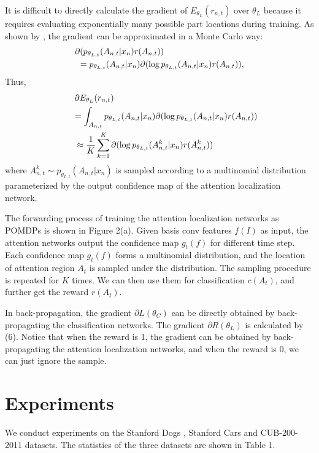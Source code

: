 \documentclass[10pt,twocolumn,letterpaper]{article}
\begin{document}
It is difficult to directly calculate the gradient of $E_{\theta_L}(r_{n,t})$ over $\theta_L$ because it requires evaluating exponentially many possible part locations during training.
As shown by \cite{bd20}, the gradient can be approximated in a Monte Carlo way:
\begin{eqnarray}
\partial (p_{\theta_{L,t}}(A_{n,t}|x_n)r(A_{n,t})) \hspace{1.3in}\\
= p_{\theta_{L,t}}(A_{n,t}|x_n) \partial (\log p_{\theta_{L,t}}(A_{n,t}|x_n)r(A_{n,t})) , \nonumber
\end{eqnarray}
Thus,
\begin{eqnarray}
\partial E_{\theta_L}(r_{n,t}) \hspace{2.1in}\\
 = \int_{A_{n,t}} p_{\theta_{L,t}}(A_{n,t}|x_n) \partial (\log p_{\theta_{L,t}}(A_{n,t}|x_n)r(A_{n,t})) \hspace{-0.215in} \nonumber\\
 \approx \frac{1}{K} \sum_{k=1}^K \partial(\log p_{\theta_{L,t}}(A_{n,t}^k|x_n)r(A_{n,t}^k)) \hspace{0.5in} \nonumber
\end{eqnarray}
where $A_{n,t}^k\sim p_{\theta_{L,t}}(A_{n,t}|x_n) $ is sampled according to a multinomial distribution parameterized by the output confidence map of the attention localization network.

The forwarding process of training the attention localization networks as POMDPs is shown in Figure 2(a). Given basis conv features $f(I)$ as input, the attention networks output the confidence map $g_t(f)$ for different time step. Each confidence map $g_t(f)$ forms a multinomial distribution, and the location of attention region $A_t$ is sampled under the distribution. The sampling procedure is repeated for $K$ times. We can then use them for classification $c(A_t)$, and further get the reward $r(A_t)$.

In back-propagation, the gradient $\partial L(\theta_C)$ can be directly obtained by back-propagating the classification networks. The gradient $\partial R(\theta_L)$ is calculated by (6). Notice that when the reward is 1, the gradient can be obtained by back-propagating the attention localization networks, and when the reward is 0, we can just ignore the sample.

\section{Experiments}
We conduct experiments on the Stanford Dogs \cite{bd4}, Stanford Cars \cite{bd5} and CUB-200-2011 \cite{bd6} datasets.
The statistics of the three datasets are shown in Table 1.
\end{document}
